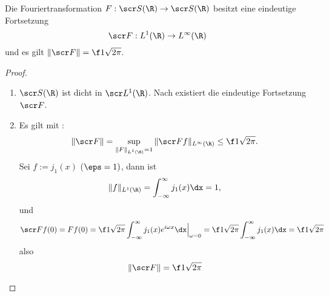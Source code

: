 \begin{st} \label{4.24}
	Die Fouriertransformation $F: \scr S(\R) \to \scr S(\R)$ besitzt eine eindeutige Fortsetzung
	\[
		\scr F: L^1(\R) \to L^\infty(\R)
	\]
	und es gilt $\|\scr F\| = \f 1{\sqrt{2\pi}}$.
	\begin{proof}
		\begin{enumerate}[1)]
			\item
				$\scr S(\R)$ ist dicht in $\scr L^1(\R)$.
				Nach  existiert die eindeutige Fortsetzung $\scr F$.
			\item
				Es gilt mit :
				\[
					\| \scr F\| = \sup_{\|F\|_{L^1(\R)}=1} \|\scr F f\|_{L^\infty(\R)} \le \f 1{\sqrt{2\pi}}.
				\]
				Sei $f := j_1(x)$ ($\eps = 1)$, dann ist
				\[
					\|f\|_{L^1(\R)} = \int_{-\infty}^\infty j_1(x) \dx = 1,
				\]
				und
				\[
					\scr F f(0)
					= F f(0)
					= \f 1{\sqrt{2\pi}} \int_{-\infty}^\infty j_1(x) e^{i\omega x} \dx \Big|_{\omega = 0}
					= \f 1{\sqrt{2\pi}} \int_{-\infty}^\infty j_1(x) \dx
					= \f 1{\sqrt{2\pi}}
				\]
				also
				\[
					\| \scr F\| = \f 1{\sqrt{2\pi}}
				\]
		\end{enumerate}
	\end{proof}
\end{st}


